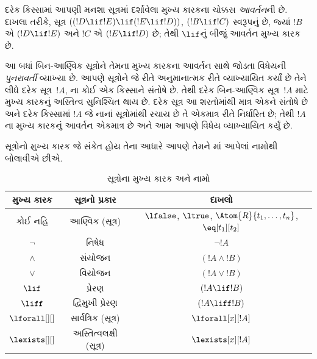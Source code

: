 દરેક કિસ્સામાં આપણી મનશા સૂત્રમાં દર્શાવેલા મુખ્ય કારકના ચોક્કસ
\emph{આવર્તન}ની છે. દાખલા તરીકે, સૂત્ર
$((!D\lif !E)\lif(!E\lif !D))$, $(!B\lif !C)$ સ્વરૂપનું છે, જ્યાં
$!B$ એ $(!D\lif !E)$ અને $!C$ એ $(!E\lif !D)$ છે; તેથી $\lif$નું
બીજું આવર્તન મુખ્ય કારક છે.

\begin{explain}
આ બધાં બિન-આણ્વિક સૂત્રોને તેમના મુખ્ય કારકના આવર્તન
સાથે જોડતા વિધેયની \emph{પુનરાવર્તી} વ્યાખ્યા છે. આપણે
સૂત્રોને જે રીતે અનુમાનાત્મક રીતે વ્યાખ્યાયિત કર્યાં છે તેને
લીધે દરેક સૂત્ર~$!A$, ના કોઈ એક કિસ્સાને
સંતોષે છે. તેથી દરેક બિન-આણ્વિક સૂત્ર~$!A$ માટે મુખ્ય કારકનું અસ્તિત્વ સુનિશ્ચિત થાય છે. દરેક સૂત્ર આ શરતોમાંથી
માત્ર એકને સંતોષે છે અને દરેક કિસ્સામાં $!A$ જે નાનાં
સૂત્રોમાંથી રચાય છે તે એકમાત્ર રીતે નિર્ધારિત છે; તેથી $!A$ના
મુખ્ય કારકનું આવર્તન એકમાત્ર છે અને આમ આપણે વિધેય
વ્યાખ્યાયિત કર્યું છે.
\end{explain}

સૂત્રોનો મુખ્ય કારક જે સંકેત હોય તેના આધારે આપણે તેમને
માં આપેલાં નામોથી બોલાવીએ છીએ.


\begin{table}[!h]
\centering
\begin{tabular}{c | c | c}
મુખ્ય કારક & સૂત્રનો પ્રકાર & દાખલો\\
\hline
કોઈ નહિ & આણ્વિક (સૂત્ર) &
$\lfalse$,
$\ltrue$,
$\Atom{R}{t_1, \dots, t_n}$,
$\eq[t_1][t_2]$\\
$\lnot$ & નિષેધ & $\lnot !A$ \\
$\land$ & સંયોજન & $(!A \land !B)$ \\
$\lor$ & વિયોજન & $(!A \lor !B)$ \\
$\lif$ & પ્રેરણ & $(!A \lif !B)$ \\
$\liff$ & દ્વિમુખી પ્રેરણ & $(!A \liff !B)$ \\
$\lforall[][]$ & સાર્વત્રિક (સૂત્ર)& $\lforall[x][!A]$ \\
$\lexists[][]$ & અસ્તિત્વલક્ષી (સૂત્ર)& $\lexists[x][!A]$
\end{tabular}
\caption{સૂત્રોના મુખ્ય કારક અને નામો}
\end{table}
\endgroup


